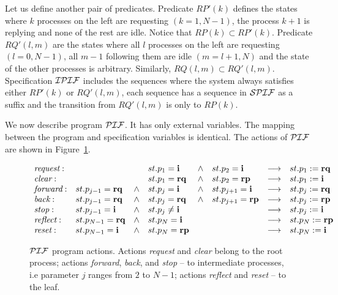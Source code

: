 \documentclass[11pt]{llncs}
\def\PROG#1{${\cal #1}$}
\begin{document}
Let us define another pair of predicates. Predicate $RP'(k)$ defines
the states where $k$ processes on the left are requesting $(k=1,N-1)$,
the process $k+1$ is replying and none of the rest are idle. Notice
that $RP(k) \subset RP'(k)$. Predicate $RQ'(l,m)$ are the states where
all $l$ processes on the left are requesting $(l=0,N-1)$, all $m-1$
following them are idle $(m = l+1, N)$ and the state of the other
processes is arbitrary. Similarly, $RQ(l,m) \subset
RQ'(l,m)$. Specification \PROG{IPIF} includes the sequences where the
system always satisfies either $RP'(k)$ or $RQ'(l,m)$, each sequence
has a sequence in \PROG{SPIF} as a suffix and the transition from
$RQ'(l,m)$ is only to $RP(k)$.

We now describe program \PROG{PIF}. It has only external
variables. The mapping between the program and specification variables
is identical. The actions of \PROG{PIF} are shown in
Figure~\ref{figPIF}.

\begin{figure}
\[
\begin{array}{llllllll}
\emph{request}:& & &st.p_1 = \textbf{i} &\wedge& st.p_2=\textbf{i} 
   & \longrightarrow& st.p_1 := \textbf{rq} \\
\emph{clear}:  & & &st.p_1 = \textbf{rq} &\wedge& st.p_2 = \textbf{rp}
    & \longrightarrow& st.p_1 := \textbf{i} \\
\emph{forward}:& st.p_{j-1} = \textbf{rq} &\wedge& st.p_{j}=\textbf{i} &\wedge& st.p_{j+1} = \textbf{i} 
   &\longrightarrow& st.p_j :=\textbf{rq}\\
\emph{back}:   & st.p_{j-1} = \textbf{rq} &\wedge& st.p_{j}=\textbf{rq} &\wedge& st.p_{j+1}=\textbf{rp} 
   &\longrightarrow& st.p_{j} :=\textbf{rp}\\
\emph{stop}:& st.p_{j-1} = \textbf{i} &\wedge& st.p_{j} \neq \textbf{i} & & 
   &\longrightarrow & st.p_j :=\textbf{i} \\
\emph{reflect}:& st.p_{N-1}=\textbf{rq} &\wedge& st.p_N = \textbf{i} &&
   &\longrightarrow & st.p_{N} := \textbf{rp} \\
\emph{reset}:&   st.p_{N-1} = \textbf{i} &\wedge& st.p_N = \textbf{rp} && 
   &\longrightarrow & st.p_{N} := \textbf{i}
\end{array}
\]
\caption{\PROG{PIF} program actions. Actions \emph{request} and
  \emph{clear} belong to the root process; actions \emph{forward},
  \emph{back}, and \emph{stop} -- to intermediate processes, i.e
  parameter $j$ ranges from $2$ to $N-1$; actions \emph{reflect} and
  \emph{reset} -- to the leaf.  }\label{figPIF}
\end{figure}
\end{document}
